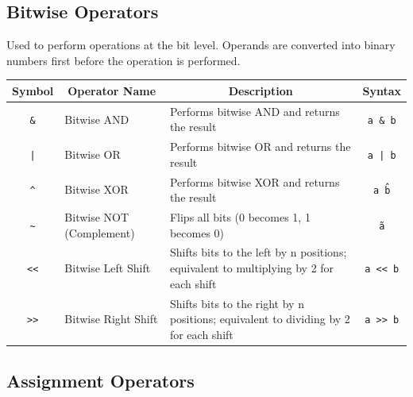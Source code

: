 \subsection{Bitwise Operators}

Used to perform operations at the bit level.  
Operands are converted into binary numbers first before the operation is performed.
\begin{center}
    \begin{tabular}{|c|l|p{8cm}|c|}
        \hline
        \multicolumn{1}{|c|}{\textbf{Symbol}} &
        \multicolumn{1}{c|}{\textbf{Operator Name}} &
        \multicolumn{1}{c|}{\textbf{Description}} &
        \multicolumn{1}{c|}{\textbf{Syntax}} \\ \hline
        \texttt{\&}  & Bitwise AND             & Performs bitwise AND and returns the result & \texttt{a \& b} \\ \hline
        \texttt{|}   & Bitwise OR              & Performs bitwise OR and returns the result & \texttt{a | b} \\ \hline
        \texttt{\^}  & Bitwise XOR             & Performs bitwise XOR and returns the result & \texttt{a \^ b} \\ \hline
        \texttt{\~}  & Bitwise NOT (Complement)& Flips all bits (0 becomes 1, 1 becomes 0) & \texttt{\~a} \\ \hline
        \texttt{<<}  & Bitwise Left Shift      & Shifts bits to the left by n positions; equivalent to multiplying by 2 for each shift & \texttt{a << b} \\ \hline
        \texttt{>>}  & Bitwise Right Shift     & Shifts bits to the right by n positions; equivalent to dividing by 2 for each shift & \texttt{a >> b} \\ \hline
    \end{tabular}
\end{center}

\subsection{Assignment Operators}

